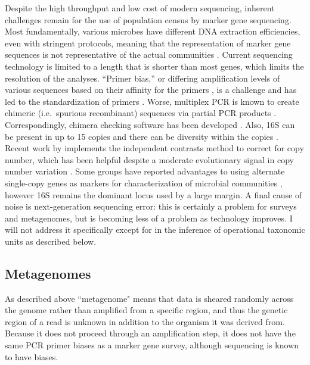 \documentclass{amsart}
\begin{document}
Despite the high throughput and low cost of modern sequencing, inherent challenges remain for the use of population census by marker gene sequencing.
Most fundamentally, various microbes have different DNA extraction efficiencies, even with stringent protocols, meaning that the representation of marker gene sequences is not representative of the actual communities \citep{morgan2010metagenomic}.
Current sequencing technology is limited to a length that is shorter than most genes, which limits the resolution of the analyses.
``Primer bias,'' or differing amplification levels of various sequences based on their affinity for the primers \citep{suzuki1996bias,polz1998bias}, is a challenge and has led to the standardization of primers \citep{methe2012framework}.
Worse, multiplex PCR is known to create chimeric (i.e.\ spurious recombinant) sequences via partial PCR products \citep{hugenholtz2003chimeric,ashelford2005least,haas2011chimeric,schloss2011reducing}.
Correspondingly, chimera checking software has been developed \citep[including][]{ashelford2006new,edgar2011uchime}.
Also, 16S can be present in up to 15 copies and there can be diversity within the copies \citep{klappenbach2001rrndb}.
Recent work by \citet{kembel2012incorporating} implements the independent contrasts \citep{felsenstein1985phylogenies} method to correct for copy number, which has been helpful despite a moderate evolutionary signal in copy number variation \citep{klappenbach2000rrna}.
Some groups have reported advantages to using alternate single-copy genes as markers for characterization of microbial communities \citep[e.g.][]{case2007rpob,mcnabb2004hsp65}, however 16S remains the dominant locus used by a large margin.
A final cause of noise is next-generation sequencing error: this is certainly a problem for surveys and metagenomes, but is becoming less of a problem as technology improves.
I will not address it specifically except for in the inference of operational taxonomic units as described below.

\subsection{Metagenomes}
As described above ``metagenome" means that data is sheared randomly across the genome rather than amplified from a specific region, and thus the genetic region of a read is unknown in addition to the organism it was derived from.
Because it does not proceed through an amplification step, it does not have the same PCR primer biases as a marker gene survey, although sequencing is known to have biases.
\end{document}
